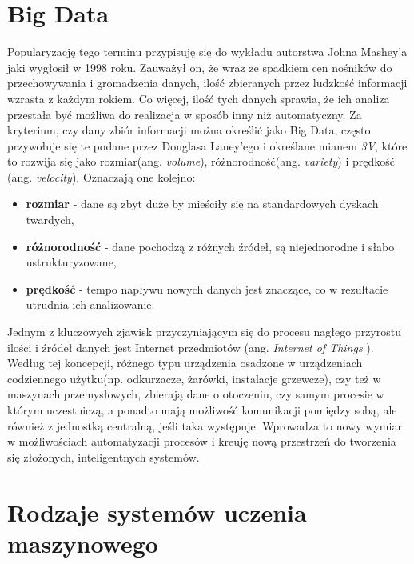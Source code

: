 \section{Big Data}

Popularyzację tego terminu przypisuję się do wykładu autorstwa Johna Mashey'a \cite{mashey} jaki wygłosił w 1998 roku. Zauważył on, że wraz ze spadkiem cen nośników do przechowywania i gromadzenia danych, ilość zbieranych przez ludzkość informacji wzrasta z każdym rokiem. Co więcej, ilość tych danych sprawia, że ich analiza przestała być możliwa do realizacja w sposób inny niż automatyczny. Za kryterium, czy dany zbiór informacji można określić jako Big Data, często przywołuje się te podane przez Douglasa Laney'ego \cite{laney} i określane mianem \textit{3V}, które to rozwija się jako rozmiar(ang. \textit{volume}), różnorodność(ang. \textit{variety}) i prędkość (ang. \textit{velocity}). Oznaczają one kolejno:
\begin{itemize}
	\item \textbf{rozmiar} - dane są zbyt duże by mieściły się na standardowych dyskach twardych,
	\item \textbf{różnorodność} - dane pochodzą z różnych źródeł, są niejednorodne i słabo ustrukturyzowane,
	\item \textbf{prędkość} - tempo napływu nowych danych jest znaczące, co w rezultacie utrudnia ich analizowanie.
	\\
\end{itemize}

Jednym z kluczowych zjawisk przyczyniającym się do procesu nagłego przyrostu ilości i źródeł danych jest Internet przedmiotów (ang. \textit{Internet of Things} \cite{iot}). Według tej koncepcji, różnego typu urządzenia osadzone w urządzeniach codziennego użytku(np. odkurzacze, żarówki, instalacje grzewcze), czy też w maszynach przemysłowych, zbierają dane o otoczeniu, czy samym procesie w którym uczestniczą, a ponadto mają możliwość komunikacji pomiędzy sobą, ale również z jednostką centralną, jeśli taka występuje. Wprowadza to nowy wymiar w możliwościach automatyzacji procesów i kreuję nową przestrzeń do tworzenia się złożonych, inteligentnych systemów.

\section{Rodzaje systemów uczenia maszynowego}

